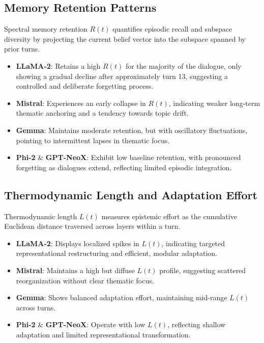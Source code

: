 \documentclass[11pt]{article}
\begin{document}
\subsection{Memory Retention Patterns}
Spectral memory retention $R(t)$ quantifies episodic recall and subspace diversity by projecting the current belief vector into the subspace spanned by prior turns.  
\begin{itemize}
    \item \textbf{LLaMA-2}: Retains a high $R(t)$ for the majority of the dialogue, only showing a gradual decline after approximately turn 13, suggesting a controlled and deliberate forgetting process.
    \item \textbf{Mistral}: Experiences an early collapse in $R(t)$, indicating weaker long-term thematic anchoring and a tendency towards topic drift.
    \item \textbf{Gemma}: Maintains moderate retention, but with oscillatory fluctuations, pointing to intermittent lapses in thematic focus.
    \item \textbf{Phi-2} \& \textbf{GPT-NeoX}: Exhibit low baseline retention, with pronounced forgetting as dialogues extend, reflecting limited episodic integration.
\end{itemize}

\subsection{Thermodynamic Length and Adaptation Effort}
Thermodynamic length $L(t)$ measures epistemic effort as the cumulative Euclidean distance traversed across layers within a turn.
\begin{itemize}
    \item \textbf{LLaMA-2}: Displays localized spikes in $L(t)$, indicating targeted representational restructuring and efficient, modular adaptation.
    \item \textbf{Mistral}: Maintains a high but diffuse $L(t)$ profile, suggesting scattered reorganization without clear thematic focus.
    \item \textbf{Gemma}: Shows balanced adaptation effort, maintaining mid-range $L(t)$ across turns.
    \item \textbf{Phi-2} \& \textbf{GPT-NeoX}: Operate with low $L(t)$, reflecting shallow adaptation and limited representational transformation.
\end{itemize}
\end{document}
